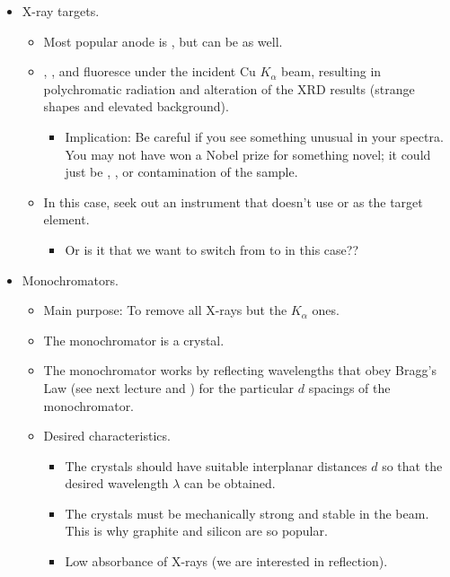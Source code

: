 \documentclass[../notes.tex]{subfiles}
\begin{document}
\begin{itemize}
\begin{itemize}
\begin{itemize}
        \end{itemize}
    \end{itemize}
    \item X-ray targets.
    \begin{itemize}
        \item Most popular anode is , but can be  as well.
        \item {}, , and  fluoresce under the incident Cu $K_\alpha$ beam, resulting in polychromatic radiation and alteration of the XRD results (strange shapes and elevated background).
        \begin{itemize}
            \item Implication: Be careful if you see something unusual in your spectra. You may not have won a Nobel prize for something novel; it could just be , , or  contamination of the sample.
        \end{itemize}
        \item In this case, seek out an instrument that doesn't use  or  as the target element.
        \begin{itemize}
            \item Or is it that we want to switch from  to  in this case??
        \end{itemize}
    \end{itemize}
    \item Monochromators.
    \begin{itemize}
        \item Main purpose: To remove all X-rays but the $K_\alpha$ ones.
        \item The monochromator is a crystal.
        \item The monochromator works by reflecting wavelengths that obey Bragg's Law (see next lecture and \textcite{bib:CHEM26300Notes}) for the particular $d$ spacings of the monochromator.
        \item Desired characteristics.
        \begin{itemize}
            \item The crystals should have suitable interplanar distances $d$ so that the desired wavelength $\lambda$ can be obtained.
            \item The crystals must be mechanically strong and stable in the beam. This is why graphite and silicon are so popular.
            \item Low absorbance of X-rays (we are interested in reflection).

\end{itemize}
\end{itemize}
\end{itemize}
\end{document}
